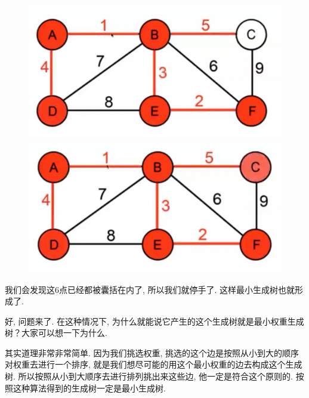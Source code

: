 \begin{figure}[ht]
  \centering
  \begin{minipage}[t]{0.4\textwidth}
    \centering
    \caption{}
    \label{fig:img27_14}
    \includegraphics[width=\textwidth]{asset/01a127e3-24ba-4f89-8ce7-fe6fce090e4f.jpg}
  \end{minipage}%
  \hspace{1em}
  \begin{minipage}[t]{0.4\textwidth}
    \centering
    \caption{}
    \label{fig:img27_15}
    \includegraphics[width=\textwidth]{asset/9fef2b67-86cd-49ba-812d-a3e920ee59f3.jpg}
  \end{minipage}
\end{figure}

我们会发现这6点已经都被囊括在内了, 所以我们就停手了. 这样最小生成树也就形成了. 

好, 问题来了. 在这种情况下, 为什么就能说它产生的这个生成树就是最小权重生成树？大家可以想一下为什么. 

其实道理非常非常简单. 因为我们挑选权重, 挑选的这个边是按照从小到大的顺序对权重去进行一个排序, 就是我们想尽可能的用这个最小权重的边去构成这个生成树. 所以按照从小到大顺序去进行排列挑出来这些边, 他一定是符合这个原则的. 按照这种算法得到的生成树一定是最小生成树. 

